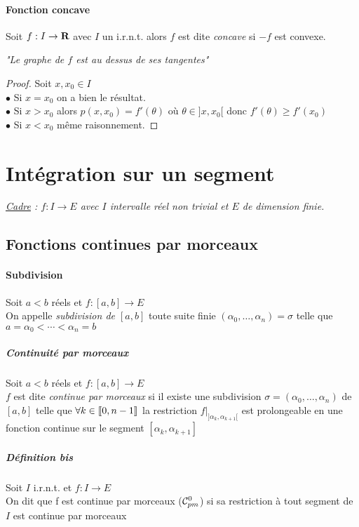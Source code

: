     
    \traitd
    \paragraph{Fonction concave}
        Soit $f:I\rightarrow {\mathbf{R}}$ avec $I$ un i.r.n.t. alors $f$ est dite \emph{concave} si $-f$ est convexe. 
    \trait
    
    
	\textit{"Le graphe de $f$ est au dessus de ses tangentes"}
    
    \begin{proof}
    Soit $x,x_0 \in I$ \\$\bullet$ Si $x=x_0$ on a bien le résultat.\\ $\bullet$ Si $x>x_0$ alors $p(x,x_0) = f'(\theta )$ où 
    $\theta \in ]x,x_0[$ donc $f'(\theta ) \geqslant f'(x_0)$ \\ $\bullet$ Si $x<x_0$ même raisonnement.
    \end{proof} \medskip
    
    
\section{Intégration sur un segment}

    \textit{\underline{Cadre} : $f:I\rightarrow E$ avec $I$ intervalle réel non trivial et $E$ de dimension \emph{finie}.}
	
	\subsection{Fonctions continues par morceaux}
    	
    	\vspace{-15pt}
    	\traitd
    	\paragraph{Subdivision}
        		Soit $a<b$ réels et $f:[a,b]\rightarrow E$ \\ 
        		On appelle \emph{subdivision de $[a,b]$} toute suite finie $(\alpha_0 , \dots , \alpha_n ) = \sigma$ telle que $a=\alpha_0 < \cdots <\alpha_n = b$
        	\traitdouble
    	\subparagraph{Continuité par morceaux}
        		Soit $a<b$ réels et $f:[a,b]\rightarrow E$ \\ 
        		$f$ est dite \emph{continue par morceaux} si il existe une subdivision $\sigma = (\alpha_0 ,\dots ,\alpha_n)$ de $[a,b]$ telle que $\forall k\in {\llbracket 0,n-1 \rrbracket}$ la restriction $f|_{]\alpha_k , \alpha_{k+1}[} $ est prolongeable en une fonction continue sur le segment $[\alpha_k , \alpha_{k+1}]$ 
        	\traitdouble
        	\subparagraph{Définition bis}
			Soit $I$ i.r.n.t. et $f:I\rightarrow E$ \\
			On dit que f est continue par morceaux (${\mathcal{C}_{pm}^0}$) si sa restriction à tout segment de $I$ est continue par morceaux 
        	\trait
    
